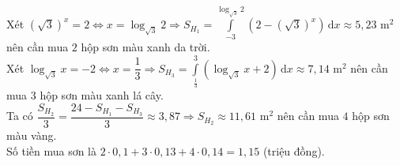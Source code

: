 \begin{ex}
{Xét $\left(\sqrt{3}\right)^x=2\Leftrightarrow x=\log _{\sqrt{3}}2\Rightarrow S_{H_1}=\displaystyle \int \limits_{-3}^{\log _{\sqrt{3}}2}\left(2-\left(\sqrt{3}\right)^x\right)\mathrm{\,d}x\approx 5{,}23$ m$^2$ nên cần mua $2$ hộp sơn màu xanh da trời.\\
Xét $\log _{\sqrt{3}}x=-2\Leftrightarrow x=\dfrac{1}{3}\Rightarrow S_{H_3}=\displaystyle \int \limits_{\frac{1}{3}}^3\left(\log _{\sqrt{3}}x+2\right)\mathrm{\,d}x\approx 7{,}14$ m$^2$ nên cần mua $3$ hộp sơn màu xanh lá cây.\\
Ta có $\dfrac{S_{H_2}}{3}=\dfrac{24-S_{H_1}-S_{H_3}}{3}\approx 3{,}87\Rightarrow S_{H_2}\approx 11{,}61$ m$^2$ nên cần mua $4$ hộp sơn màu vàng.\\
Số tiền mua sơn là $2\cdot 0{,}1+3\cdot 0{,}13+4\cdot 0{,}14=1{,}15$ (triệu đồng).
}
\end{ex}

